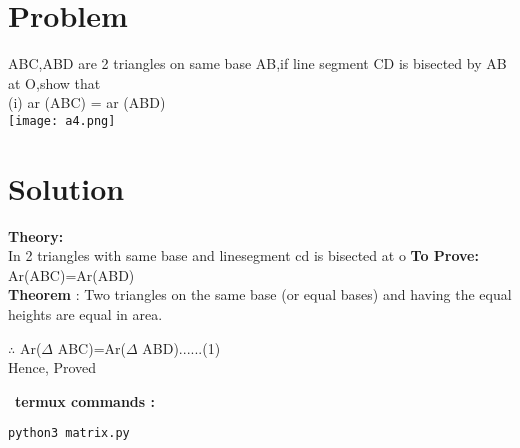 \documentclass[10pt, a4paper]{article}
\title{\mytitle}
\author{\myauthor\hspace{1em}\\\contact\\FWC22031\hspace{6.5em}IITH\hspace{0.5em}\mymodule\hspace{6em}ASSIGN-5}
\date{}
\begin{document}
	\maketitle
	\tableofcontents
   \section{Problem}
   ABC,ABD are 2 triangles on same base AB,if line segment CD is bisected by AB at O,show that \\
(i) ar (ABC) = ar (ABD) \\       


	    \texttt{[image: a4.png]}
   \section{Solution}
   \textbf{Theory:}\\
In 2 triangles with same base and linesegment cd is bisected at o  
\textbf{To Prove:} Ar(ABC)=Ar(ABD) \\
\textbf{Theorem} : Two triangles on the same base (or equal bases) and having the equal heights are equal in area.
\begin{center}
$\therefore$ Ar($\Delta$ ABC)=Ar($\Delta$ ABD)......(1)\\
Hence, Proved    
\end{center}


\
\textbf{termux commands :}
\begin{lstlisting}
python3 matrix.py
\end{lstlisting}
\end{document}
